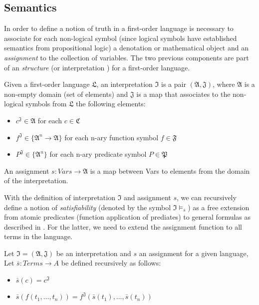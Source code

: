 \subsection{Semantics}

In order to define a notion of truth in a first-order language is necessary to associate for each non-logical symbol (since logical symbols have established semantics from propositional logic) a denotation or mathematical object and an \emph{assignment} to the collection of variables. The two previous components are part of an \emph{structure} \cite{DBLP:books/daglib/0076838} (or interpretation \cite{DBLP:books/daglib/0080654}) for a first-order language.

\begin{definition}
  Given a first-order language $\mathfrak{L}$, an interpretation $\mathfrak{I}$ is a pair $(\mathfrak{A}, \mathfrak{J})$, where $\mathfrak{A}$ is a non-empty domain (set of elements) and $\mathfrak{J}$ is a map that associates to the non-logical symbols from $\mathfrak{L}$ the following elements:
  \begin{itemize}
    \item $c^{\mathfrak{J}} \in \mathfrak{A}$ for each $c \in \mathfrak{C}$
    \item $f^{\mathfrak{J}} \in \{\mathfrak{A}^n \rightarrow \mathfrak{A}\}$ for each n-ary function symbol $f \in \mathfrak{F}$
    \item $P^{\mathfrak{J}} \in \{\mathfrak{A}^n\}$ for each n-ary predicate symbol $P \in \mathfrak{P}$
  \end{itemize}
  An assignment $s : Vars \rightarrow \mathfrak{A}$ is a map between Vars to elements from the domain of the interpretation.
\end{definition}

With the definition of interpretation $\mathfrak{I}$ and assignment $s$, we can recursively define a notion of \emph{satisfiability} (denoted by the symbol $\mathfrak{I} \models_s $) as a free extension from atomic predicates (function application of prediates) to general formulas as described in \cite{DBLP:books/daglib/0076838}. For the latter, we need to extend the assignment function to all terms in the language.

\begin{definition}
  Let $\mathfrak{I} = (\mathfrak{A}, \mathfrak{J})$ be an interpretation and $s$ an assignment for a given language,
  Let $\bar{s} : Terms \rightarrow A$ be defined recursively as follows:
  \begin{itemize}
    \item $\bar{s}(c) = c^\mathfrak{J}$
    \item $\bar{s}(f(t_1, \dots, t_n)) = f^\mathfrak{J}(\bar{s}(t_1), \dots, \bar{s}(t_n))$
  \end{itemize}
\end{definition}

